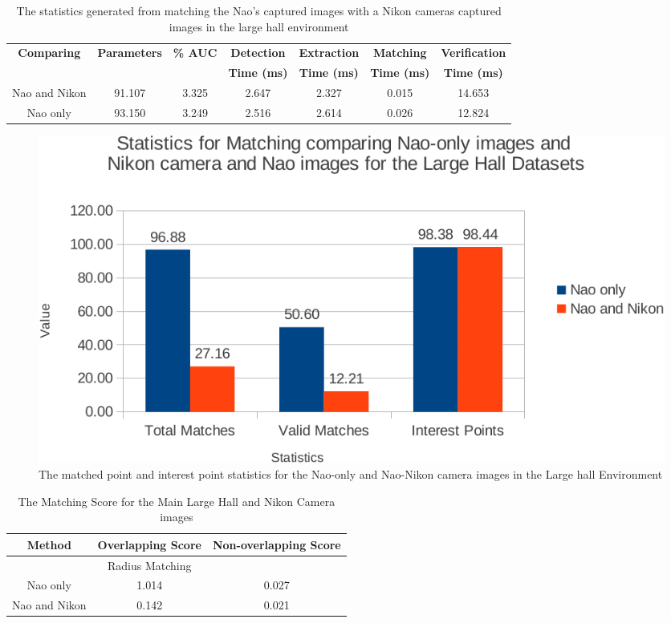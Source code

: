 \documentclass[11pt]{report}
\begin{document}
\begin{table}
\caption{The statistics generated from matching the Nao's captured images with
a Nikon cameras captured images in the large hall environment}
\footnotesize
\begin{tabular}{|c|c|c|c|c|c|c|}
\hline 
\textbf{Comparing} & \textbf{Parameters} & \textbf{\% AUC} & \textbf{Detection} & \textbf{Extraction} & \textbf{Matching} & \textbf{Verification}\tabularnewline
 &  &  & \textbf{Time (ms)} & \textbf{Time (ms)} & \textbf{Time (ms)} & \textbf{Time (ms)}\tabularnewline
\hline 
\hline 
Nao and Nikon & 91.107 & 3.325 & 2.647 & 2.327 & 0.015 & 14.653\tabularnewline
\hline 
Nao only & 93.150 & 3.249 & 2.516 & 2.614 & 0.026 & 12.824\tabularnewline
\hline 
\end{tabular}
\label{tab:naoNikonLargeHall}
\end{table}

\begin{figure}[h!] 
  \centering
    \includegraphics[width=1.0\textwidth]{../Drawings/Graphs/nikon_lh_matches_keypoints_best.pdf}
    \caption{The matched point and interest point statistics for the Nao-only and Nao-Nikon camera images in the Large hall Environment}
    \label{fig:nikon_lh_matches_keypoints}
\end{figure}


\begin{table}
\caption{The Matching Score for the Main Large Hall and Nikon Camera images}
\begin{tabular}{|c|c|c|}
\hline 
Method & Overlapping Score & Non-overlapping Score\tabularnewline
\hline 
\hline 
 & Radius Matching & \tabularnewline
\hline 
Nao only & 1.014 & 0.027\tabularnewline
\hline 
Nao and Nikon & 0.142 & 0.021\tabularnewline
\hline 
\end{tabular}
\label{tab:nklhMS}
\end{table}
\end{document}
